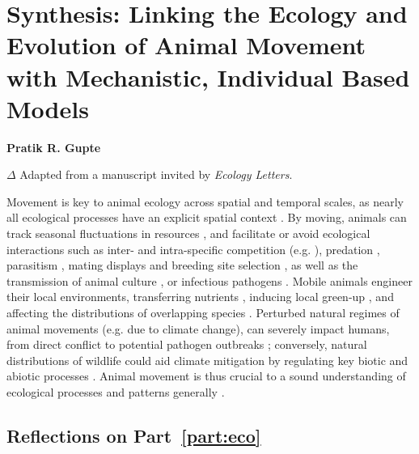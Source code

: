 
%
\chapter{Synthesis: Linking the Ecology and Evolution of Animal Movement with Mechanistic, Individual Based Models}\label{ch:discussion}

{\noindent \textbf{Pratik R. Gupte}}

\medskip

{\noindent \large{$\Delta$}} Adapted from a manuscript invited by \textit{Ecology Letters}.

\medskip

Movement is key to animal ecology across spatial and temporal scales, as nearly all ecological processes have an explicit spatial context \citep{nathan2008a}.
By moving, animals can track seasonal fluctuations in resources \citep{geremia2019,abrahms2021a}, and facilitate or avoid ecological interactions such as inter- and intra-specific competition (e.g. \cite{duckworth2007}), predation \citep[e.g.][]{kohl2018}, parasitism \citep{weinstein2018}, mating displays and breeding site selection \citep{kempenaers2017}, as well as the transmission of animal culture \citep{jesmer2018,klump2021}, or infectious pathogens \citep[][see also Chapter~\ref{ch:pathomove}]{weinstein2018,monk2022,stroeymeyt2018}.
Mobile animals engineer their local environments, transferring nutrients \citep{leroux2018}, inducing local green-up \citep{geremia2019}, and affecting the distributions of overlapping species \citep[see e.g.][]{kohl2018,leroux2018,duckworth2007,monk2022}.
Perturbed natural regimes of animal movements (e.g. due to climate change), can severely impact humans, from direct conflict \citep{abrahms2021} to potential pathogen outbreaks \citep{carlson2022a,wille2022}; conversely, natural distributions of wildlife could aid climate mitigation by regulating key biotic and abiotic processes \citep{schmitz2018,malhi2022}.
Animal movement is thus crucial to a sound understanding of ecological processes and patterns generally \citep{jeltsch2013,schlagel2020}.

\section*{Reflections on Part~\ref{part:eco}}

